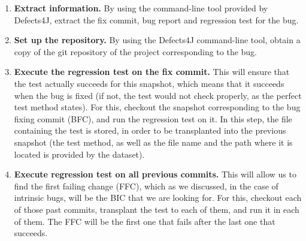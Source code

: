 \begin{enumerate}
  \item \textbf{Extract information.} 
    By using the command-line tool provided by Defects4J, extract the fix commit, bug report and regression test for the bug.
  \item \textbf{Set up the repository.} 
    By using the Defects4J command-line tool, obtain a copy of the git repository of the project corresponding to the bug.
  \item \textbf{Execute the regression test on the fix commit.} 
    This will ensure that the test actually succeeds for this snapshot, which means that it succeeds when the bug is fixed (if not, the test would not check properly, as the perfect test method states). For this, checkout the snapshot corresponding to the bug fixing commit (BFC), and run the regression test on it.
    In this step, the file containing the test is stored, in order to be transplanted into the previous snapshot (the test method, as well as the file name and the path where it is located is provided by the dataset).
  \item \textbf{Execute regression test on all previous commits.}
    This will allow us to find the first failing change (FFC), which as we discussed, in the case of intrinsic bugs, will be the BIC that we are looking for. For this, checkout each of those past commits, transplant the test to each of them, and run it in each of them. 
    The FFC will be the first one that fails after the last one that succeeds. 
\end{enumerate}

